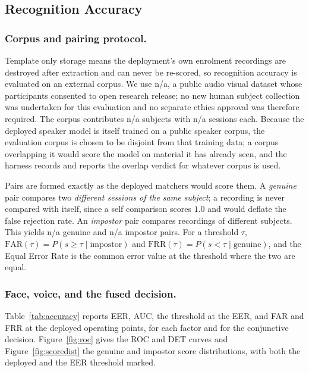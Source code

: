 \documentclass[runningheads]{llncs}
\providecommand{\EvalCorpusName}{n/a}
\providecommand{\EvalSubjects}{n/a}
\providecommand{\EvalSessions}{n/a}
\providecommand{\EvalGenuinePairs}{n/a}
\providecommand{\EvalImpostorPairs}{n/a}
\begin{document}
{\color{black}

\subsection{Recognition Accuracy}\label{sec:accuracy}

\subsubsection{Corpus and pairing protocol.}
Template only storage means the deployment's own enrolment recordings are destroyed after extraction and can never be re-scored, so recognition accuracy is evaluated on an external corpus. We use \EvalCorpusName, a public audio visual dataset whose participants consented to open research release; no new human subject collection was undertaken for this evaluation and no separate ethics approval was therefore required. The corpus contributes \EvalSubjects{} subjects with \EvalSessions{} sessions each. Because the deployed speaker model is itself trained on a public speaker corpus, the evaluation corpus is chosen to be disjoint from that training data; a corpus overlapping it would score the model on material it has already seen, and the harness records and reports the overlap verdict for whatever corpus is used.

Pairs are formed exactly as the deployed matchers would score them. A \emph{genuine} pair compares two \emph{different sessions of the same subject}; a recording is never compared with itself, since a self comparison scores $1.0$ and would deflate the false rejection rate. An \emph{impostor} pair compares recordings of different subjects. This yields \EvalGenuinePairs{} genuine and \EvalImpostorPairs{} impostor pairs. For a threshold $\tau$, $\mathrm{FAR}(\tau)=P(s\geq\tau\mid\text{impostor})$ and $\mathrm{FRR}(\tau)=P(s<\tau\mid\text{genuine})$, and the Equal Error Rate is the common error value at the threshold where the two are equal.

\subsubsection{Face, voice, and the fused decision.}
Table~\ref{tab:accuracy} reports EER, AUC, the threshold at the EER, and FAR and FRR at the deployed operating points, for each factor and for the conjunctive decision. Figure~\ref{fig:roc} gives the ROC and DET curves and Figure~\ref{fig:scoredist} the genuine and impostor score distributions, with both the deployed and the EER threshold marked.

}
\end{document}
